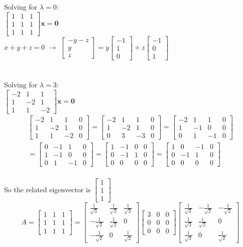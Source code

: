\documentclass{article}
\newcommand\tab[1][1cm]{\hspace*{#1}}
\newcommand{\newVect}[3]{\begin{bmatrix}#1 \\ #2 \\ #3\end{bmatrix}}
\newcommand{\newttt}[9]{\begin{bmatrix}#1 & #2 & #3\\ #4 & #5 & #6 \\ #7 & #8 & #9\end{bmatrix}}
\begin{document}
\begin{enumerate}
\begin{enumerate}
\tab Solving for $\lambda = 0$:\\
$\newttt{1}{1}{1}{1}{1}{1}{1}{1}{1}\textbf{x} = \textbf{0}$\\
$x+y+z=0$ \tab $\rightarrow$ \tab 
$\newVect{-y-z}{y}{z} = y\newVect{-1}{1}{0}+z\newVect{-1}{0}{1}$\\\\\\

\tab Solving for $\lambda = 3$:\\
$\newttt{-2}{1}{1}{1}{-2}{1}{1}{1}{-2}\textbf{x} = \textbf{0}$\\
\[\begin{array}{c}
\begin{bmatrix}-2&1&1&0\\1&-2&1&0\\1&1&-2&0\end{bmatrix}
=\begin{bmatrix}-2&1&1&0\\1&-2&1&0\\0&3&-3&0\end{bmatrix}
=\begin{bmatrix}-2&1&1&0\\1&-1&0&0\\0&1&-1&0\end{bmatrix}\\
=\begin{bmatrix}0&-1&1&0\\1&-1&0&0\\0&1&-1&0\end{bmatrix}
=\begin{bmatrix}1&-1&0&0\\0&-1&1&0\\0&0&0&0\end{bmatrix}
=\begin{bmatrix}1&0&-1&0\\0&-1&1&0\\0&0&0&0\end{bmatrix}
\end{array}\]\\
So the related eigenvector is $\newVect{1}{1}{1}$\\
$$A = \newttt{1}{1}{1}{1}{1}{1}{1}{1}{1} = \newttt{\frac{1}{\sqrt{3}}}{\frac{1}{\sqrt{3}}}{\frac{1}{\sqrt{3}}}{-\frac{1}{\sqrt{2}}}{\frac{1}{\sqrt{2}}}{0}{-\frac{1}{\sqrt{2}}}{0}{\frac{1}{\sqrt{2}}}\newttt{3}{0}{0}{0}{0}{0}{0}{0}{0}
\newttt{\frac{1}{\sqrt{3}}}{-\frac{1}{\sqrt{2}}}{-\frac{1}{\sqrt{2}}}{\frac{1}{\sqrt{3}}}{\frac{1}{\sqrt{2}}}{0}{\frac{1}{\sqrt{3}}}{0}{\frac{1}{\sqrt{2}}}$$
\end{enumerate}
\par
\newpage



\end{enumerate}
\end{document}
